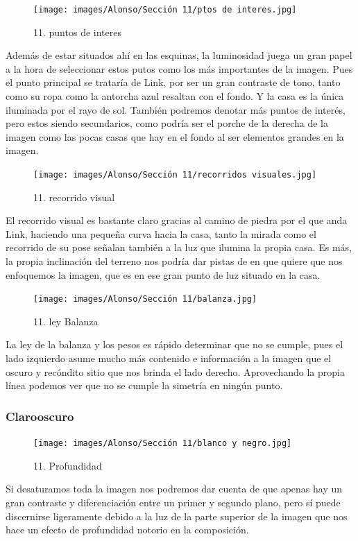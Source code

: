 \documentclass[12pt]{article}
\begin{document}
    \begin{figure}[H]
      \centering
      \texttt{[image: images/Alonso/Sección 11/ptos de interes.jpg]}
      \caption{\small 11. puntos de interes}
    \end{figure}
    Además de estar situados ahí en las esquinas, la luminosidad juega un gran papel a la hora de seleccionar estos putos como los más importantes de la imagen. Pues el punto principal se trataría de Link, por ser un gran contraste de tono, tanto como su ropa como la antorcha azul resaltan con el fondo. Y la casa es la única iluminada por el rayo de sol.
    También podremos denotar más puntos de interés, pero estos siendo secundarios, como podría ser el porche de la derecha de la imagen como las pocas casas que hay en el fondo al ser elementos grandes en la imagen.

    \begin{figure}[H]
      \centering
      \texttt{[image: images/Alonso/Sección 11/recorridos visuales.jpg]}
      \caption{\small 11. recorrido visual}
    \end{figure}
    El recorrido visual es bastante claro gracias al camino de piedra por el que anda Link, haciendo una pequeña curva hacia la casa, tanto la mirada como el recorrido de su pose señalan también a la luz que ilumina la propia casa. Es más, la propia inclinación del terreno nos podría dar pistas de en que quiere que nos enfoquemos la imagen, que es en ese gran punto de luz situado en la casa.

\begin{figure}[H]
      \centering
      \texttt{[image: images/Alonso/Sección 11/balanza.jpg]}
      \caption{\small 11. ley Balanza}
    \end{figure}
    La ley de la balanza y los pesos es rápido determinar que no se cumple, pues el lado izquierdo asume mucho más contenido e información a la imagen que el oscuro y recóndito sitio que nos brinda el lado derecho. Aprovechando la propia línea podemos ver que no se cumple la simetría en ningún punto.


        \subsubsection{Clarooscuro}
        \begin{figure}[H]
      \centering
      \texttt{[image: images/Alonso/Sección 11/blanco y negro.jpg]}
      \caption{\small 11. Profundidad}
    \end{figure}
    Si desaturamos toda la imagen nos podremos dar cuenta de que apenas hay un gran contraste y diferenciación entre un primer y segundo plano, pero sí puede discernirse ligeramente debido a la luz de la parte superior de la imagen que nos hace un efecto de profundidad notorio en la composición.
\end{document}
